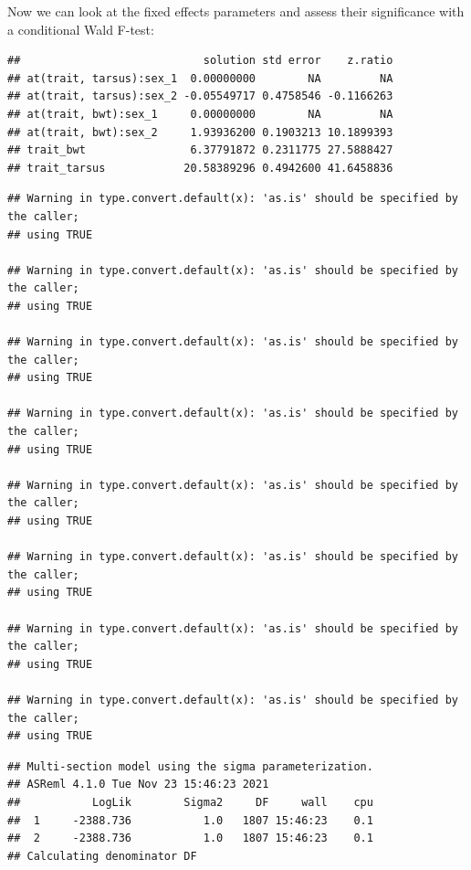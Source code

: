 \documentclass[
  12pt,
]{book}
\newenvironment{Shaded}{\begin{snugshade}}{\end{snugshade}}
\newcommand{\DataTypeTok}[1]{\textcolor[rgb]{0.13,0.29,0.53}{#1}}
\newcommand{\KeywordTok}[1]{\textcolor[rgb]{0.13,0.29,0.53}{\textbf{#1}}}
\newcommand{\NormalTok}[1]{#1}
\newcommand{\OperatorTok}[1]{\textcolor[rgb]{0.81,0.36,0.00}{\textbf{#1}}}
\newcommand{\OtherTok}[1]{\textcolor[rgb]{0.56,0.35,0.01}{#1}}
\newcommand{\StringTok}[1]{\textcolor[rgb]{0.31,0.60,0.02}{#1}}
\begin{document}
Now we can look at the fixed effects parameters and assess their significance with a conditional Wald F-test:

\begin{Shaded}
\end{Shaded}

\begin{verbatim}
##                            solution std error    z.ratio
## at(trait, tarsus):sex_1  0.00000000        NA         NA
## at(trait, tarsus):sex_2 -0.05549717 0.4758546 -0.1166263
## at(trait, bwt):sex_1     0.00000000        NA         NA
## at(trait, bwt):sex_2     1.93936200 0.1903213 10.1899393
## trait_bwt                6.37791872 0.2311775 27.5888427
## trait_tarsus            20.58389296 0.4942600 41.6458836
\end{verbatim}

\begin{verbatim}
## Warning in type.convert.default(x): 'as.is' should be specified by the caller;
## using TRUE

## Warning in type.convert.default(x): 'as.is' should be specified by the caller;
## using TRUE

## Warning in type.convert.default(x): 'as.is' should be specified by the caller;
## using TRUE

## Warning in type.convert.default(x): 'as.is' should be specified by the caller;
## using TRUE

## Warning in type.convert.default(x): 'as.is' should be specified by the caller;
## using TRUE

## Warning in type.convert.default(x): 'as.is' should be specified by the caller;
## using TRUE

## Warning in type.convert.default(x): 'as.is' should be specified by the caller;
## using TRUE

## Warning in type.convert.default(x): 'as.is' should be specified by the caller;
## using TRUE
\end{verbatim}

\begin{verbatim}
## Multi-section model using the sigma parameterization.
## ASReml 4.1.0 Tue Nov 23 15:46:23 2021
##           LogLik        Sigma2     DF     wall    cpu
##  1     -2388.736           1.0   1807 15:46:23    0.1
##  2     -2388.736           1.0   1807 15:46:23    0.1
## Calculating denominator DF
\end{verbatim}
\end{document}
